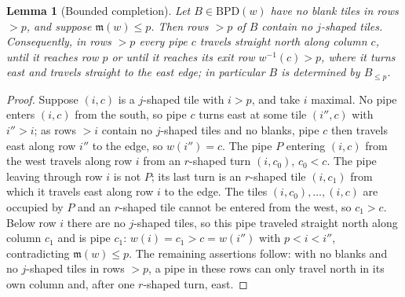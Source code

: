 \documentclass{amsart}
\newtheorem{lemma}{Lemma}[subsection]
\theoremstyle{definition}
\theoremstyle{remark}
\numberwithin{equation}{subsection}
\newcommand{\maxd}{\mathfrak{m}}
\begin{document}
\begin{lemma}[Bounded completion]\label{lemma:bpdcompletion}
Let $B\in\mathrm{BPD}(w)$ have no blank tiles in rows $>p$, and suppose $\maxd(w)\leq p$. Then rows $>p$ of $B$ contain no $j$-shaped tiles. Consequently, in rows $>p$ every pipe $c$ travels straight north along column $c$, until it reaches row $p$ or until it reaches its exit row $w^{-1}(c)>p$, where it turns east and travels straight to the east edge; in particular $B$ is determined by $B_{\leq p}$.
\end{lemma}
\begin{proof}
Suppose $(i,c)$ is a $j$-shaped tile with $i>p$, and take $i$ maximal. No pipe enters $(i,c)$ from the south, so pipe $c$ turns east at some tile $(i'',c)$ with $i''>i$; as rows $>i$ contain no $j$-shaped tiles and no blanks, pipe $c$ then travels east along row $i''$ to the edge, so $w(i'')=c$. The pipe $P$ entering $(i,c)$ from the west travels along row $i$ from an $r$-shaped turn $(i,c_0)$, $c_0<c$. The pipe leaving through row $i$ is not $P$; its last turn is an $r$-shaped tile $(i,c_1)$ from which it travels east along row $i$ to the edge. The tiles $(i,c_0),\ldots,(i,c)$ are occupied by $P$ and an $r$-shaped tile cannot be entered from the west, so $c_1>c$. Below row $i$ there are no $j$-shaped tiles, so this pipe traveled straight north along column $c_1$ and is pipe $c_1$: $w(i)=c_1>c=w(i'')$ with $p<i<i''$, contradicting $\maxd(w)\leq p$. The remaining assertions follow: with no blanks and no $j$-shaped tiles in rows $>p$, a pipe in these rows can only travel north in its own column and, after one $r$-shaped turn, east.
\end{proof}
\end{document}
